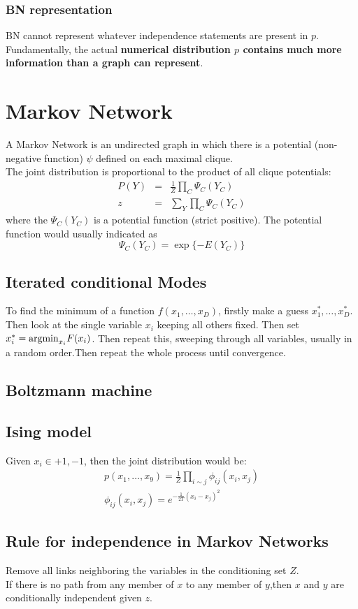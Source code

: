 \documentclass[12pt,a4paper]{article}
\begin{document}
\subsubsection*{BN representation}
BN cannot represent whatever independence statements are present in $p$.\\
Fundamentally, the actual \textbf{numerical distribution $p$ contains much more information than a graph can represent}.

\section*{Markov Network}
A Markov Network is an undirected graph in which there is a potential (non-negative function) $\psi$ defined on each maximal clique.\\
The joint distribution is proportional to the product of all clique potentials:
\begin{eqnarray*}
P(Y) &=& \frac{1}{Z}\prod_{C}\Psi_C(Y_C) \\
z &=& \sum_Y\prod_{C}\Psi_C(Y_C)
\end{eqnarray*}
where the $\Psi_C(Y_C)$ is a potential function (strict positive). The potential function would usually indicated as 
$$
\Psi_C(Y_C) = \exp\{-E(Y_C)\}
$$
\subsection*{Iterated conditional Modes}
To find the minimum of a function $f(x_1,\ldots,x_D)$, firstly make a guess $x_1^*,\ldots,x_D^*$. Then look at the single variable $x_i$ keeping all others fixed. Then set $x_i^*={\rm argmin}_{x_i}F(x_i)$.
Then repeat this, sweeping through all variables, usually in a random order.Then repeat the whole process until convergence.
\subsection*{Boltzmann machine}
\subsection*{Ising model}
Given $x_i\in {+1,-1}$, then the joint distribution would be:
\begin{eqnarray*}
p(x_1,\ldots,x_9)=\frac{1}{Z}\prod_{i\sim j}\phi_{ij}(x_i,x_j)\\
\phi_{ij}(x_i,x_j) = e^{-\frac{1}{2T}(x_i-x_j)^2}
\end{eqnarray*}
\subsection*{Rule for independence in Markov Networks}
Remove all links neighboring the variables in the conditioning set $Z$.\\
If there is no path from any member of $x$ to any member of $y$,then $x$ and $y$ are conditionally independent given $z$.
\end{document}
